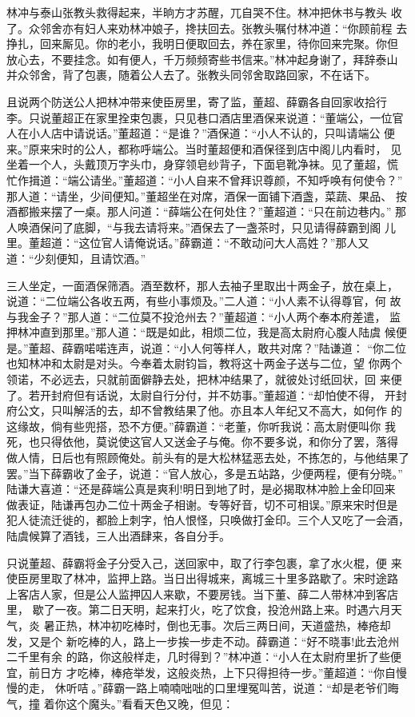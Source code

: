 林冲与泰山张教头救得起来，半晌方才苏醒，兀自哭不住。林冲把休书与教头
收了。众邻舍亦有妇人来劝林冲娘子，搀扶回去。张教头嘱付林冲道：“你顾前程
去挣扎，回来厮见。你的老小，我明日便取回去，养在家里，待你回来完聚。你但
放心去，不要挂念。如有便人，千万频频寄些书信来。”林冲起身谢了，拜辞泰山
并众邻舍，背了包裹，随着公人去了。张教头同邻舍取路回家，不在话下。

且说两个防送公人把林冲带来使臣房里，寄了监，董超、薛霸各自回家收拾行
李。只说董超正在家里拴束包裹，只见巷口酒店里酒保来说道：“董端公，一位官
人在小人店中请说话。”董超道：“是谁？”酒保道：“小人不认的，只叫请端公
便来。”原来宋时的公人，都称呼端公。当时董超便和酒保径到店中阁儿内看时，
见坐着一个人，头戴顶万字头巾，身穿领皂纱背子，下面皂靴净袜。见了董超，慌
忙作揖道：“端公请坐。”董超道：“小人自来不曾拜识尊颜，不知呼唤有何使令？”
那人道：“请坐，少间便知。”董超坐在对席，酒保一面铺下酒盏，菜蔬、果品、
按酒都搬来摆了一桌。那人问道：“薛端公在何处住？”董超道：“只在前边巷内。”
那人唤酒保问了底脚，“与我去请将来。”酒保去了一盏茶时，只见请得薛霸到阁
儿里。董超道：“这位官人请俺说话。”薛霸道：“不敢动问大人高姓？”那人又
道：“少刻便知，且请饮酒。”

三人坐定，一面酒保筛酒。酒至数杯，那人去袖子里取出十两金子，放在桌上，
说道：“二位端公各收五两，有些小事烦及。”二人道：“小人素不认得尊官，何
故与我金子？”那人道：“二位莫不投沧州去？”董超道：“小人两个奉本府差遣，
监押林冲直到那里。”那人道：“既是如此，相烦二位，我是高太尉府心腹人陆虞
候便是。”董超、薛霸喏喏连声，说道：“小人何等样人，敢共对席？”陆谦道：
“你二位也知林冲和太尉是对头。今奉着太尉钧旨，教将这十两金子送与二位，望
你两个领诺，不必远去，只就前面僻静去处，把林冲结果了，就彼处讨纸回状，回
来便了。若开封府但有话说，太尉自行分付，并不妨事。”董超道：“却怕使不得，
开封府公文，只叫解活的去，却不曾教结果了他。亦且本人年纪又不高大，如何作
的这缘故，倘有些兜搭，恐不方便。”薛霸道：“老董，你听我说：高太尉便叫你
我死，也只得依他，莫说使这官人又送金子与俺。你不要多说，和你分了罢，落得
做人情，日后也有照顾俺处。前头有的是大松林猛恶去处，不拣怎的，与他结果了
罢。”当下薛霸收了金子，说道：“官人放心，多是五站路，少便两程，便有分晓。”
陆谦大喜道：“还是薛端公真是爽利!明日到地了时，是必揭取林冲脸上金印回来
做表证，陆谦再包办二位十两金子相谢。专等好音，切不可相误。”原来宋时但是
犯人徒流迁徙的，都脸上刺字，怕人恨怪，只唤做打金印。三个人又吃了一会酒，
陆虞候算了酒钱，三人出酒肆来，各自分手。

只说董超、薛霸将金子分受入己，送回家中，取了行李包裹，拿了水火棍，便
来使臣房里取了林冲，监押上路。当日出得城来，离城三十里多路歇了。宋时途路
上客店人家，但是公人监押囚人来歇，不要房钱。当下董、薛二人带林冲到客店里，
歇了一夜。第二日天明，起来打火，吃了饮食，投沧州路上来。时遇六月天气，炎
暑正热，林冲初吃棒时，倒也无事。次后三两日间，天道盛热，棒疮却发，又是个
新吃棒的人，路上一步挨一步走不动。薛霸道：“好不晓事!此去沧州二千里有余
的路，你这般样走，几时得到？”林冲道：“小人在太尉府里折了些便宜，前日方
才吃棒，棒疮举发，这般炎热，上下只得担待一步。”董超道：“你自慢慢的走，
休听咭。”薛霸一路上喃喃咄咄的口里埋冤叫苦，说道：“却是老爷们晦气，撞
着你这个魔头。”看看天色又晚，但见：

